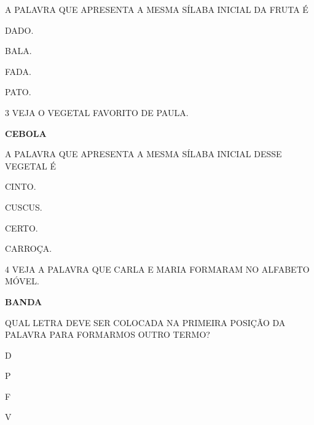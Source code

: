 A PALAVRA QUE APRESENTA A MESMA SÍLABA INICIAL DA FRUTA É

\begin{escolha}

\item DADO.

\item BALA.

\item FADA.

\item PATO.

\end{escolha}

\num{3} VEJA O VEGETAL FAVORITO DE PAULA.

\begin{myquote}
\begin{center}
\textbf{CEBOLA}
\end{center}
\end{myquote}

A PALAVRA QUE APRESENTA A MESMA SÍLABA INICIAL DESSE VEGETAL É

\begin{escolha}

\item CINTO.

\item CUSCUS.

\item CERTO.

\item CARROÇA.

\end{escolha}

\pagebreak
\num{4} VEJA A PALAVRA QUE CARLA E MARIA FORMARAM NO ALFABETO MÓVEL.

\begin{myquote}
\begin{center}
\textbf{BANDA}
\end{center}
\end{myquote}

QUAL LETRA DEVE SER COLOCADA NA PRIMEIRA POSIÇÃO DA PALAVRA PARA FORMARMOS OUTRO TERMO?

\begin{escolha}

\item D

\item P

\item F

\item V

\end{escolha}

